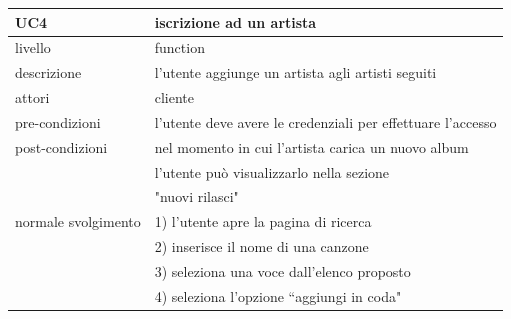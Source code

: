 \documentclass{article}
\begin{document}
  \begin{table}[H]
    \centering
    \begin{tabular}{|l|l|}
      \hline
      \textbf{UC4}                     & \textbf{iscrizione ad un artista}                           \\
      \hline
      livello                          & function                                                    \\
      \hline
      descrizione                      & l'utente aggiunge un artista agli artisti seguiti           \\
      \hline
      attori                           & cliente                                                     \\
      \hline
      pre-condizioni                   & l'utente deve avere le credenziali per effettuare l'accesso \\
      \hline
      post-condizioni                  & nel momento in cui l'artista carica un nuovo album          \\
      & l'utente può visualizzarlo nella sezione                    \\
      & "nuovi rilasci"                                             \\
      \hline
      normale svolgimento \hspace{5pt} & 1) l'utente apre la pagina di ricerca                       \\
      & 2) inserisce il nome di una canzone                         \\
      & 3) seleziona una voce dall'elenco proposto                  \\
      & 4) seleziona l'opzione ``aggiungi in coda"
      \\
      \hline
    \end{tabular}
    \label{tab:uct4}
  \end{table}

  \vspace{40pt}
\end{document}
